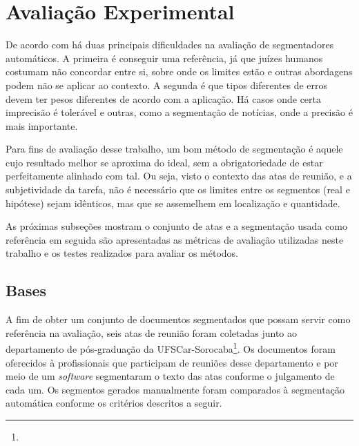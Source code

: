 
\section{Avaliação Experimental}
\label{sec:avaliacao}





De acordo com \cite{Pevzner2002} há duas principais dificuldades na avaliação de segmentadores automáticos. A primeira é conseguir uma referência, já que juízes humanos costumam não concordar entre si, sobre onde os limites estão e outras abordagens podem não se aplicar ao contexto. A segunda é que tipos diferentes de erros devem ter pesos diferentes de acordo com a aplicação. Há casos onde certa imprecisão é tolerável e outras, como a segmentação de notícias, onde a precisão é mais importante.


Para fins de avaliação desse trabalho, um bom método de segmentação é aquele cujo resultado melhor se aproxima do ideal, sem a obrigatoriedade de estar perfeitamente alinhado com tal. Ou seja, visto o contexto das atas de reunião, e a subjetividade da tarefa, não é necessário que os limites entre os segmentos (real e hipótese) sejam idênticos, mas que se assemelhem em localização e quantidade.




As próximas subseções mostram o conjunto de atas e a segmentação usada como referência em seguida são apresentadas as métricas de avaliação utilizadas neste trabalho e os testes realizados para avaliar os métodos.



\subsection{Bases}
	\label{subsec:bases}

	
	A fim de obter um conjunto de documentos segmentados que possam servir como referência na avaliação, seis atas de reunião foram coletadas junto ao departamento de pós-graduação da UFSCar-Sorocaba\footnote{\urlatas}. Os documentos foram oferecidos à profissionais que participam de reuniões desse departamento e por meio de um \textit{software} segmentaram o texto das atas conforme o julgamento de cada um. Os segmentos gerados manualmente foram comparados à segmentação automática conforme os critérios descritos a seguir.




